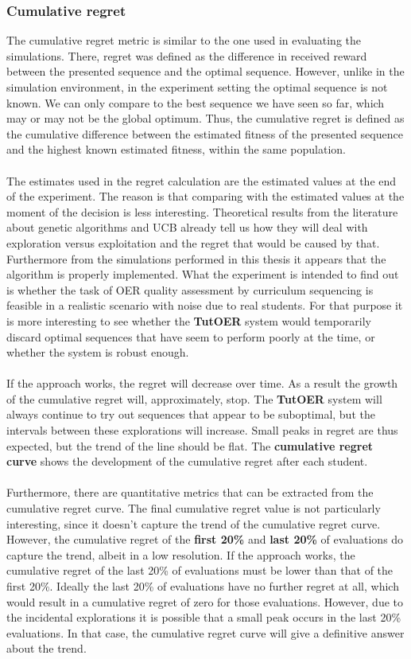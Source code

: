\subsubsection{Cumulative regret}
The cumulative regret metric is similar to the one used in evaluating the
simulations. There, regret was defined as the difference in received reward
between the presented sequence and the optimal sequence. However, unlike in the
simulation environment, in the experiment setting the optimal sequence is not
known. We can only compare to the best sequence we have seen so far, which may
or may not be the global optimum. Thus, the cumulative regret is defined as the
cumulative difference between the estimated fitness of the presented sequence
and the highest known estimated fitness, within the same population.\\\\
\noindent
The estimates used in the regret calculation are the estimated values at the
end of the experiment. The reason is that comparing with the estimated values
at the moment of the decision is less interesting. Theoretical results from the
literature about genetic algorithms and UCB already tell us how they will deal
with exploration versus exploitation and the regret that would be caused by
that. Furthermore from the simulations performed in this thesis it appears that
the algorithm is properly implemented. What the experiment is intended to find
out is whether the task of OER quality assessment by curriculum sequencing is
feasible in a realistic scenario with noise due to real students. For that
purpose it is more interesting to see whether the \textbf{TutOER} system would
temporarily discard optimal sequences that have seem to perform poorly at the
time, or whether the system is robust enough.\\\\
\noindent
If the approach works, the regret will decrease over time. As a result the
growth of the cumulative regret will, approximately, stop. The \textbf{TutOER}
system will always continue to try out sequences that appear to be suboptimal,
but the intervals between these explorations will increase. Small peaks in
regret are thus expected, but the trend of the line should be flat. The
\textbf{cumulative regret curve} shows the development of the cumulative regret
after each student.\\\\
\noindent
Furthermore, there are quantitative metrics that can be extracted from
the cumulative regret curve. The final cumulative regret value is not
particularly interesting, since it doesn't capture the trend of the cumulative
regret curve. However, the cumulative regret of the \textbf{first 20\%} and
\textbf{last 20\%} of evaluations do capture the trend, albeit in a low
resolution. If the approach works, the cumulative regret of the last 20\% of
evaluations must be lower than that of the first 20\%. Ideally the last 20\% of
evaluations have no further regret at all, which would result in a cumulative
regret of zero for those evaluations. However, due to the incidental
explorations it is possible that a small peak occurs in the last 20\%
evaluations. In that case, the cumulative regret curve will give a definitive
answer about the trend.
